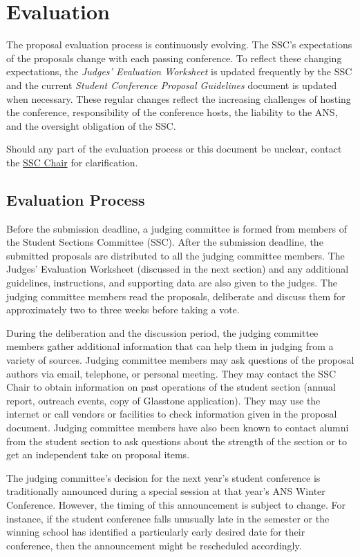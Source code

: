 \documentclass[12pt]{article}
\begin{document}
\newpage
\section{Evaluation} \label{sec:Eval}
The proposal evaluation process is continuously evolving. The SSC’s expectations of the proposals change with each passing conference. To reflect these changing expectations, the \textit{Judges’ Evaluation Worksheet} is updated frequently by the SSC and the current \textit{Student Conference Proposal Guidelines} document is updated when necessary.
These regular changes reflect the increasing challenges of hosting the conference, responsibility of the conference hosts, the liability to the ANS, and the oversight obligation of the SSC.

Should any part of the evaluation process or this document be unclear, contact the \href{mailto:sscChair@gmail.com}{SSC Chair} for clarification.

\subsection{Evaluation Process}
Before the submission deadline, a judging committee is formed from members of the
Student Sections Committee (SSC). After the submission deadline, the submitted
proposals are distributed to all the judging committee members. The Judges’ Evaluation
Worksheet (discussed in the next section) and any additional guidelines, instructions, and supporting data are also given to the judges. The judging committee members read the proposals, deliberate and discuss them for approximately two to three weeks before
taking a vote.

During the deliberation and the discussion period, the judging committee members gather additional information that can help them in judging from a variety of sources.
Judging committee members may ask questions of the proposal authors via email, telephone, or personal meeting.
They may contact the SSC Chair to obtain information on past operations of the student section (annual report, outreach events, copy of Glasstone application). They may use the internet or call vendors or facilities to check information given in the proposal document. Judging committee members have also been known to contact alumni from the student section to ask questions about the strength of the section or to get an independent take on proposal items.

The judging committee’s decision for the next year's student conference is traditionally announced during a special session at that year's ANS Winter Conference.
However, the timing of this announcement is subject to change. For instance, if the student conference falls unusually late in the semester or the winning school has identified a particularly early desired date for their conference, then the announcement might be rescheduled accordingly.
\end{document}
